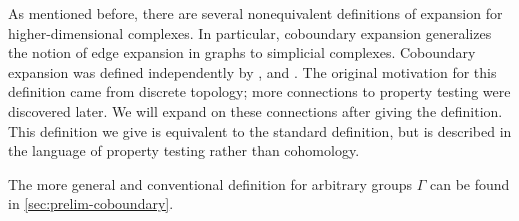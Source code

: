 \documentclass[10pt,a4paper]{article}
\newcommand{\prettyref}[1]{\cref{#1}}
\theoremstyle{definition}
\newtheorem{definition}[theorem]{Definition}
\theoremstyle{remark}
\newcommand\sett[2]{\left\{ #1 \left| \; \vphantom{#1 #2} \right. #2  \right\}}
\newcommand{\F}{\mathbb{F}}
\numberwithin{equation}{section}
\let\pref=\prettyref
\begin{document}
As mentioned before, there are several nonequivalent definitions of expansion for higher-dimensional complexes. In particular, coboundary expansion generalizes the notion of edge expansion in graphs to simplicial complexes. 
Coboundary expansion was defined independently by \cite{LinialM2006},\cite{MeshulamW2009} and \cite{Gromov2010}. The original motivation for this definition came from discrete topology; more connections to property testing were discovered later. We will expand on these connections after giving the definition. This definition we give is equivalent to the standard definition, but is described in the language of property testing rather than cohomology.

The more general and conventional definition for arbitrary groups $\Gamma$ can be found in \pref{sec:prelim-coboundary}. 

% 
    
\end{document}
